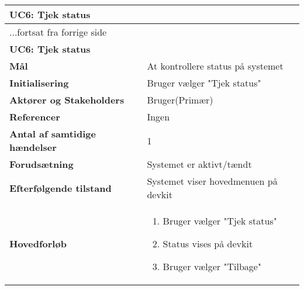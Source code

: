 \begin{center} \centering
	\begin{longtable}{|p{6cm}|p{8cm}|}  %
	\hline
		\multicolumn{2}{|l|}{\textbf{UC6: Tjek status}} \\\hline %
		\endfirsthead
		
		\multicolumn{2}{l}{...fortsat fra forrige side} \\ \hline %
		\multicolumn{2}{|l|}{\textbf{UC6: Tjek status}} \\\hline %
		\endhead	
		
		\textbf{Mål}								&At kontrollere status på systemet			\\\hline
		\textbf{Initialisering}					&Bruger vælger "Tjek status"			\\\hline
		\textbf{Aktører og Stakeholders}			&Bruger(Primær)			\\\hline
		\textbf{Referencer}						&Ingen			\\\hline
		\textbf{Antal af samtidige hændelser}	&1			\\\hline
		\textbf{Forudsætning}					&Systemet er aktivt/tændt			\\\hline
		\textbf{Efterfølgende tilstand}			&Systemet viser hovedmenuen på devkit			\\\hline
		\textbf{Hovedforløb}					
			&\begin{enumerate}
	
				\item Bruger vælger "Tjek status"
				
				\item Status vises på devkit
				
				\item Bruger vælger "Tilbage"
	
			\end{enumerate}\\\hline
	\end{longtable}
	\label{UC6} 
\end{center}

